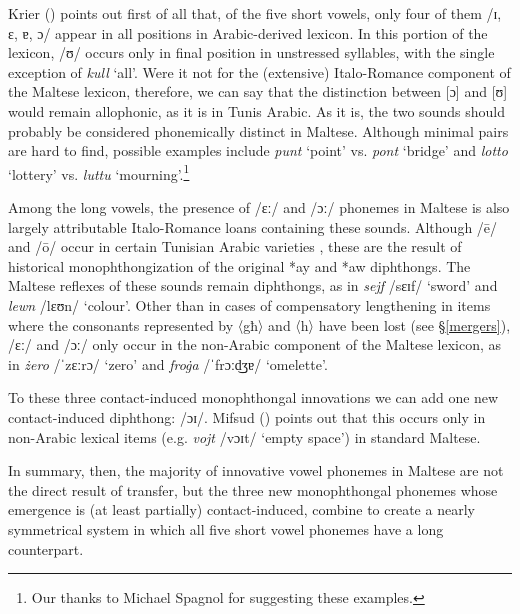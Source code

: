 \documentclass[output=paper]{langsci/langscibook}
\begin{document}
Krier (\citeyear[21]{krier1976}) points out first of all that, of the five short vowels, only four of them /ɪ, ɛ, ɐ, ɔ/ appear in all positions in Arabic-derived lexicon. In this portion of the lexicon, /ʊ/ occurs only in final position in unstressed syllables, with the single exception of \textit{kull} `all'. Were it not for the (extensive) Italo-Romance component of the Maltese lexicon, therefore, we can say that the distinction between [ɔ] and [ʊ] would remain allophonic, as it is in Tunis Arabic. As it is, the two sounds should probably be considered phonemically distinct in Maltese. Although minimal pairs are hard to find, possible examples include \textit{punt} `point' vs. \textit{pont} `bridge' and \textit{lotto} `lottery' vs. \textit{luttu} `mourning'.\footnote{Our thanks to Michael Spagnol for suggesting these examples.}

Among the long vowels, the presence of /ɛː/ and /ɔː/ phonemes in Maltese is also largely attributable Italo-Romance loans containing these sounds. Although /\={e}/ and /\={o}/ occur in certain Tunisian Arabic varieties \citep{Gibson2011,HerinZammit2017}, these are the result of historical monophthongization of the original *ay and *aw diphthongs. The Maltese reflexes of these sounds remain diphthongs, as in \textit{sejf} /sɛɪf/ `sword' and \textit{lewn} /lɛʊn/ `colour'. Other than in cases of compensatory lengthening in items where the consonants represented by 〈għ〉 and 〈h〉 have been lost (see §\ref{mergers}), /ɛː/ and /ɔː/ only occur in the non-Arabic component of the Maltese lexicon, as in \textit{żero} /ˈzɛːrɔ/ `zero' and \textit{froġa} /ˈfrɔːd͜ʒɐ/ `omelette'. 

To these three contact-induced monophthongal innovations we can add one new contact-induced diphthong: /ɔɪ/. Mifsud (\citeyear{mifsud2011}) points out that this occurs only in non-Arabic lexical items (e.g. \textit{vojt} /vɔɪt/ `empty space') in standard Maltese.

In summary, then, the majority of innovative vowel phonemes in Maltese are not the direct result of transfer, but the three new monophthongal phonemes whose emergence is (at least partially) contact-induced, combine to create a nearly symmetrical system in which all five short vowel phonemes have a long counterpart.
\end{document}

